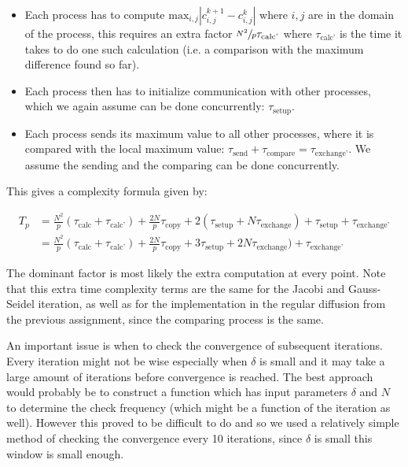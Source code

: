 \documentclass[11pt,a4paper,onecolumn]{article}
\begin{document}
\begin{itemize}
\item 
  Each process has to compute $ \text{max}_{i,j} | c_{i,j}^{k+1} - c_{i,j}^k |$ where ${i,j}$ are in the domain of the process, this requires an extra factor $\sfrac{N^2}{p}\tau_{\text{calc'}}$ where $\tau_{\text{calc'}}$ is the time it takes to do one such calculation (i.e. a comparison with the maximum difference found so far).
\item
  Each process then has to initialize communication with other processes, which we again assume can be done concurrently: $\tau_{\text{setup}}$.
\item
  Each process sends its maximum value to all other processes, where it is compared with the local maximum value: $\tau_{\text{send}} + \tau_{\text{compare}} = \tau_{\text{exchange'}}$. We assume the sending and the comparing can be done concurrently.
\end{itemize}

This gives a complexity formula given by:

\begin{align}
  \label{eq:stop}
  T_{p} &= \frac{N^2}{p} (\tau_{\text{calc}} + \tau_{\text{calc'}}) + \frac{2N}{p}\tau_{\text{copy}} + 2(\tau_{\text{setup}} + N\tau_{\text{exchange}}) + \tau_{\text{setup}} + \tau_{\text{exchange'}} \nonumber \\
  &= \frac{N^2}{p} (\tau_{\text{calc}} + \tau_{\text{calc'}}) + \frac{2N}{p}\tau_{\text{copy}} + 3\tau_{\text{setup}} + 2N\tau_{\text{exchange}}) + \tau_{\text{exchange'}}
\end{align}

The dominant factor is most likely the extra computation at every point. Note that this extra time complexity terms are the same for the Jacobi and Gauss-Seidel iteration, as well as for the implementation in the regular diffusion from the previous assignment, since the comparing process is the same. 

An important issue is when to check the convergence of subsequent iterations. Every iteration might not be wise especially when $\delta$ is small and it may take a large amount of iterations before convergence is reached. The best approach would probably be to construct a function which has input parameters $\delta$ and $N$ to determine the check frequency (which might be a function of the iteration as well). However this proved to be difficult to do and so we used a relatively simple method of checking the convergence every 10 iterations, since $\delta$ is small this window is small enough.
\end{document}
